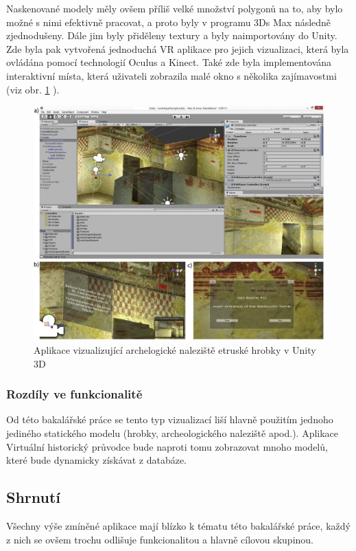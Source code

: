 \documentclass[thesis=B,czech]{FITthesis}[2012/06/26]
\begin{document}
	Naskenované modely měly ovšem příliš velké množství polygonů na to, aby bylo možné s nimi efektivně pracovat, a proto byly v programu 3Ds Max následně zjednodušeny. Dále jim byly přiděleny textury a byly naimportovány do Unity. Zde byla pak vytvořená jednoduchá VR aplikace pro jejich vizualizaci, která byla ovládána pomocí technologií Oculus a Kinect. Také zde byla implementována interaktivní místa, která uživateli zobrazila malé okno s několika zajímavostmi (viz obr. \ref{fig:tomb} ). \cite{tombs}
	
	\begin{figure}
  		\includegraphics{tomb.jpg}
  		\caption{Aplikace vizualizující archelogické naleziště etruské hrobky v Unity 3D \cite{tombs}}
  		\label{fig:tomb}
	\end{figure}

        \subsubsection{Rozdíly ve funkcionalitě}
Od této bakalářské práce se tento typ vizualizací liší hlavně použitím jednoho jediného statického modelu (hrobky, archeologického naleziště apod.). Aplikace Virtuální historický průvodce bude naproti tomu zobrazovat mnoho modelů, které bude dynamicky získávat z databáze.

\subsection{Shrnutí}
 Všechny výše zmíněné aplikace mají blízko k tématu této bakalářské práce, každý z nich se ovšem trochu odlišuje funkcionalitou a hlavně cílovou skupinou.
 
\end{document}
